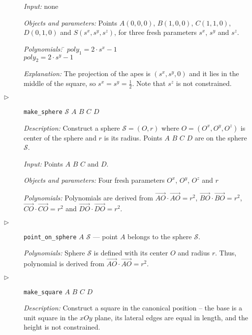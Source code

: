 \documentclass[final,1p,times,authoryear]{elsarticle}
\begin{document}
\begin{description}
  {\em Input:} none

  {\em Objects and parameters:} Points $A(0, 0, 0)$, $B(1, 0, 0)$,
  $C(1, 1, 0)$, $D(0, 1, 0)$ and $S(s^x, s^y, s^z)$, for three fresh
  parameters $s^x$, $s^y$ and $s^z$.
\begin{tabbing}
{\em Polynomials:} \= $poly_1 = 2\cdot s^x - 1$ \\
                   \> $poly_2 = 2\cdot s^y - 1$
\end{tabbing}

{\em Explanation:} The projection of the apes is $(s^x, s^y, 0)$ and
it lies in the middle of the square, so $s^x = s^y =
\frac{1}{2}$. Note that $s^z$ is not constrained.


\item[$\triangleright$] {\tt make\_sphere} $\mathcal{S}$ $A$ $B$ $C$ $D$

{\em Description:} Construct a sphere $\mathcal{S} = (O, r)$ where $O
= (O^x, O^y, O^z)$ is center of the sphere and $r$ is its
radius. Points $A$ $B$ $C$ $D$ are on the sphere $\mathcal{S}$.
  
  {\em Input:} Points $A$ $B$ $C$ and $D$.

  {\em Objects and parameters:} Four fresh
  parameters $O^x$, $O^y$, $O^z$ and $r$

{\em Polynomials:} Polynomials are derived from
$\overrightarrow{AO}\cdot\overrightarrow{AO} = r^2$,
$\overrightarrow{BO}\cdot\overrightarrow{BO} = r^2$,
$\overrightarrow{CO}\cdot\overrightarrow{CO} = r^2$ and
$\overrightarrow{DO}\cdot\overrightarrow{DO} = r^2$.

\item[$\triangleright$] {\tt point\_on\_sphere} $A$ $\mathcal{S}$ --- point $A$
  belongs to the sphere $\mathcal{S}$.

{\em Polynomials:} Sphere $\mathcal{S}$ is defined with its center $O$
and radius $r$. Thus, polynomial is derived from
$\overrightarrow{AO}\cdot\overrightarrow{AO} = r^2$.


\item[$\triangleright$] {\tt make\_square} $A$ $B$ $C$ $D$

  {\em Description:} Construct a square in the canonical position --
  the base is a unit square in the $xOy$ plane, its lateral edges are
  equal in length, and the height is not constrained.
  

\end{description}
\end{document}
